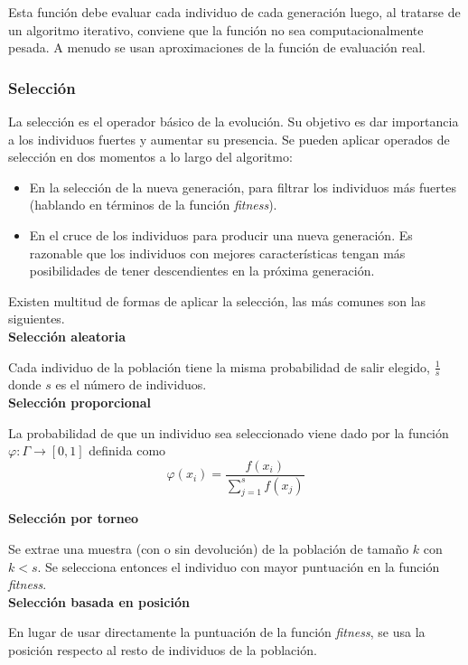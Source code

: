 \documentclass[12pt,a4paper]{article}
\begin{document}
			Esta funci\'on debe evaluar cada individuo de cada generaci\'on luego, al tratarse de un algoritmo iterativo, conviene que la funci\'on no sea computacionalmente pesada. A menudo se usan aproximaciones de la funci\'on de evaluaci\'on real.
		
			\subsubsection{Selecci\'on}
			La selecci\'on es el operador b\'asico de la evoluci\'on. Su objetivo es dar importancia a los individuos fuertes y aumentar su presencia. Se pueden aplicar operados de selecci\'on en dos momentos a lo largo del algoritmo:
			\begin{itemize}
				\item En la selecci\'on de la nueva generaci\'on, para filtrar los individuos m\'as fuertes (hablando en t\'erminos de la funci\'on \textit{fitness}).
				\item En el cruce de los individuos para producir una nueva generaci\'on. Es razonable que los individuos con mejores caracter\'isticas tengan m\'as posibilidades de tener descendientes en la pr\'oxima generaci\'on.
			\end{itemize}
			Existen multitud de formas de aplicar la selecci\'on, las m\'as comunes son las siguientes.\\
			
			\textbf{Selecci\'on aleatoria}
			
			Cada individuo de la poblaci\'on tiene la misma probabilidad de salir elegido, $\frac{1}{s}$ donde $s$ es el n\'umero de individuos.\\
			
			\textbf{Selecci\'on proporcional}
			
			La probabilidad de que un individuo sea seleccionado viene dado por la funci\'on $\varphi:\Gamma\rightarrow [0,1]$ definida como
			\[\varphi(x_i)=\frac{f(x_i)}{\sum_{j=1}^{s}f(x_j)}\]
			
			\textbf{Selecci\'on por torneo}
			
			Se extrae una muestra (con o sin devoluci\'on) de la poblaci\'on de tama\~no $k$ con $k<s$. Se selecciona entonces el individuo con mayor puntuaci\'on en la funci\'on \textit{fitness}.\\
			
			\textbf{Selecci\'on basada en posición}
			
			En lugar de usar directamente la puntuaci\'on de la funci\'on \textit{fitness}, se usa la posici\'on respecto al resto de individuos de la poblaci\'on.
			
\end{document}
